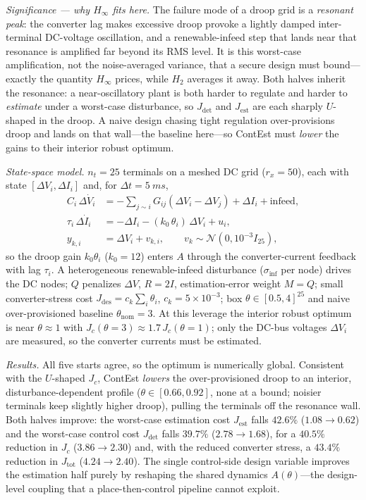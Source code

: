 \documentclass[twocolumn,amsthm]{autart}
\begin{document}
\emph{Significance --- why $H_\infty$ fits here.} The failure mode of a droop grid
is a \emph{resonant peak}: the converter lag makes excessive droop provoke a
lightly damped inter-terminal DC-voltage oscillation, and a renewable-infeed step
that lands near that resonance is amplified far beyond its RMS level. It is this
worst-case amplification, not the noise-averaged variance, that a secure design
must bound---exactly the quantity $H_\infty$ prices, while $H_2$ averages it away.
Both halves inherit the resonance: a near-oscillatory plant is both harder to
regulate and harder to \emph{estimate} under a worst-case disturbance, so
$J_{\mathrm{det}}$ and $J_{\mathrm{est}}$ are each sharply $U$-shaped in the droop.
A naive design chasing tight regulation over-provisions droop and lands on that
wall---the baseline here---so ContEst must \emph{lower} the gains to their interior
robust optimum.

\emph{State-space model.} $n_t=25$ terminals on a meshed DC grid ($r_x=50$), each
with state $[\Delta V_i,\Delta I_i]$ and, for $\Delta t=\SI{5}{ms}$,
\begin{subequations}\label{eq:mtdc}
\begin{align}
C_i\,\Delta\dot V_i &= -\!\!\sum_{j\sim i}\!G_{ij}(\Delta V_i-\Delta V_j)+\Delta I_i+\text{infeed},\\
\tau_i\,\Delta\dot I_i &= -\Delta I_i-(k_0\,\theta_i)\,\Delta V_i+u_i,\\
y_{k,i} &= \Delta V_i + v_{k,i},\qquad v_k\sim\mathcal N(0,10^{-3}I_{25}),
\end{align}
\end{subequations}
so the droop gain $k_0\theta_i$ ($k_0=12$) enters $A$ through the
converter-current feedback with lag $\tau_i$. A heterogeneous renewable-infeed
disturbance ($\sigma_{\mathrm{inf}}$ per node) drives the DC nodes; $Q$ penalizes
$\Delta V$, $R=2I$, estimation-error weight $M=Q$; small converter-stress cost
$J_{\mathrm{des}}=c_k\sum_i\theta_i$, $c_k=5\!\times\!10^{-3}$; box
$\theta\in[0.5,4]^{25}$ and naive over-provisioned baseline
$\theta_{\mathrm{nom}}=3$. At this leverage the interior robust optimum is near
$\theta\!\approx\!1$ with $J_c(\theta{=}3)\!\approx\!1.7\,J_c(\theta{=}1)$; only
the DC-bus voltages $\Delta V_i$ are measured, so the converter currents must be
estimated.

\emph{Results.} All five
starts agree, so the optimum is numerically global. Consistent with the $U$-shaped
$J_c$, ContEst \emph{lowers} the over-provisioned droop to an interior,
disturbance-dependent profile ($\theta\in[0.66,0.92]$, none at a bound; noisier
terminals keep slightly higher droop), pulling the terminals off the resonance
wall. Both halves improve: the worst-case estimation cost $J_{\mathrm{est}}$ falls
$42.6\%$ ($1.08\to0.62$) and the worst-case control cost $J_{\mathrm{det}}$ falls
$39.7\%$ ($2.78\to1.68$), for a $40.5\%$ reduction in $J_c$ ($3.86\to2.30$) and,
with the reduced converter stress, a $43.4\%$ reduction in $J_{\mathrm{tot}}$
($4.24\to2.40$). The single control-side design variable improves the estimation
half purely by reshaping the shared dynamics $A(\theta)$---the design-level coupling
that a place-then-control pipeline cannot exploit.
\end{document}
